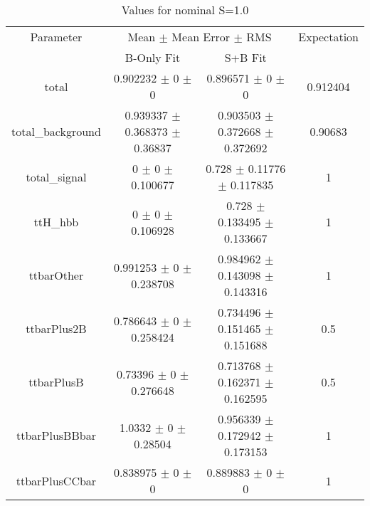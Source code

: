 \begin{table}
\centering
\caption{Values for nominal S=1.0}
\begin{tabular}{cccc}
\toprule
Parameter & \multicolumn{2}{c}{Mean $\pm$ Mean Error $\pm$ RMS} & Expectation\\
 & B-Only Fit & S+B Fit & \\
\midrule
total & \num{0.902232} $\pm$ \num{0} $\pm$ \num{0} & \num{0.896571} $\pm$ \num{0} $\pm$ \num{0} & \num{0.912404}\\
total\_background & \num{0.939337} $\pm$ \num{0.368373} $\pm$ \num{0.36837} & \num{0.903503} $\pm$ \num{0.372668} $\pm$ \num{0.372692} & \num{0.90683}\\
total\_signal & \num{0} $\pm$ \num{0} $\pm$ \num{0.100677} & \num{0.728} $\pm$ \num{0.11776} $\pm$ \num{0.117835} & \num{1}\\
ttH\_hbb & \num{0} $\pm$ \num{0} $\pm$ \num{0.106928} & \num{0.728} $\pm$ \num{0.133495} $\pm$ \num{0.133667} & \num{1}\\
ttbarOther & \num{0.991253} $\pm$ \num{0} $\pm$ \num{0.238708} & \num{0.984962} $\pm$ \num{0.143098} $\pm$ \num{0.143316} & \num{1}\\
ttbarPlus2B & \num{0.786643} $\pm$ \num{0} $\pm$ \num{0.258424} & \num{0.734496} $\pm$ \num{0.151465} $\pm$ \num{0.151688} & \num{0.5}\\
ttbarPlusB & \num{0.73396} $\pm$ \num{0} $\pm$ \num{0.276648} & \num{0.713768} $\pm$ \num{0.162371} $\pm$ \num{0.162595} & \num{0.5}\\
ttbarPlusBBbar & \num{1.0332} $\pm$ \num{0} $\pm$ \num{0.28504} & \num{0.956339} $\pm$ \num{0.172942} $\pm$ \num{0.173153} & \num{1}\\
ttbarPlusCCbar & \num{0.838975} $\pm$ \num{0} $\pm$ \num{0} & \num{0.889883} $\pm$ \num{0} $\pm$ \num{0} & \num{1}\\
\bottomrule
\end{tabular}
\end{table}